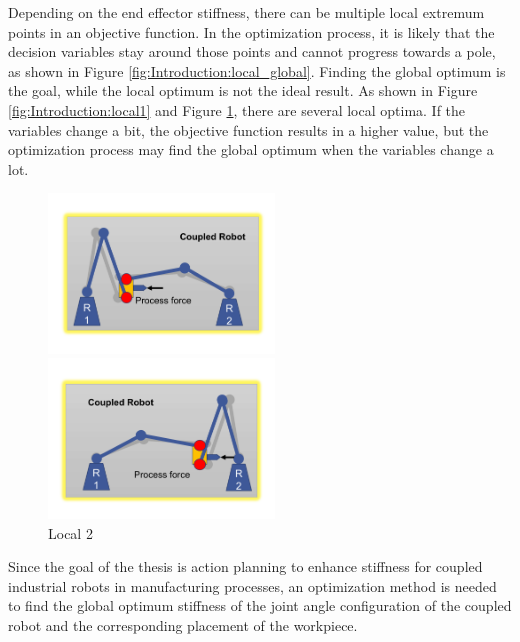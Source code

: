 Depending on the end effector stiffness, there can be multiple local extremum points in an objective function. In the optimization process, it is likely that the decision variables stay around those points and cannot progress towards a pole, as shown in Figure \ref{fig:Introduction:local_global}. Finding the global optimum is the goal, while the local optimum is not the ideal result. As shown in Figure \ref{fig:Introduction:local1} and Figure \ref{fig:Introduction:local2}, there are several local optima. If the variables change a bit, the objective function results in a higher value, but the optimization process may find the global optimum when the variables change a lot.\par
\begin{figure}[h!]
\centering
\vspace{-0.7cm}
\setlength{\abovecaptionskip}{-0.1cm} 
\begin{minipage}[t]{0.48\textwidth}
\centering
\includegraphics[width=6cm]{03_images/local1.pdf}
\caption{Local 1}
\label{fig:Introduction:local1}
\end{minipage}
\begin{minipage}[t]{0.48\textwidth}
\centering
\includegraphics[width=6cm]{03_images/local2.pdf}
\caption{Local 2}
\label{fig:Introduction:local2}
\end{minipage}
\vspace{-0.5cm}
\end{figure}
Since the goal of the thesis is action planning to enhance stiffness for coupled industrial robots in manufacturing processes, an optimization method is needed to find the global optimum stiffness of the joint angle configuration of the coupled robot and the corresponding placement of the workpiece.\par
